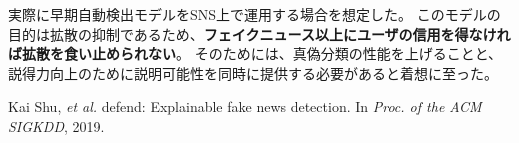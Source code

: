{	実際に早期自動検出モデルをSNS上で運用する場合を想定した。
	このモデルの目的は拡散の抑制であるため、\textbf{フェイクニュース以上にユーザの信用を得なければ拡散を食い止められない}。
	そのためには、真偽分類の性能を上げることと、説得力向上のために説明可能性を同時に提供する必要があると着想に至った。

	{\footnotesize
		\begin{thebibliography}{99}
			\vspace*{-1mm}
			\setlength{\parskip}{0cm}
			\setlength{\itemsep}{0cm}
			\setcounter{enumiv}{7}
			\begin{spacing}{0.7}
				 Kai Shu, \textit{et al.} defend: Explainable fake news detection. In \textit{Proc. of the ACM SIGKDD}, 2019.
			\end{spacing}
			\end{thebibliography}
			
	}
}


